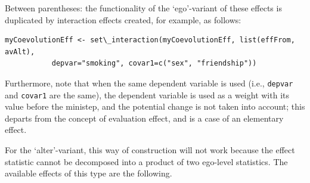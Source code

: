 \documentclass[a4paper,fleqn,11pt]{article}
\newcommand{\+}{\, + \,}
\begin{document}
Between parentheses: the functionality of the `ego'-variant of these effects is duplicated by
interaction effects created, for example, as follows:
\begin{verbatim}
myCoevolutionEff <- set\_interaction(myCoevolutionEff, list(effFrom, avAlt),
           depvar="smoking", covar1=c("sex", "friendship"))
\end{verbatim}
Furthermore, note that when the same dependent variable is used
(i.e., \texttt{depvar} and \texttt{covar1} are the same),
the dependent variable is used as a weight with its value
before the ministep, and the potential change is not taken into account;
this departs from the concept of evaluation effect,
and is a case of an elementary effect.

For the `alter'-variant, this way of construction will not work because the
effect statistic cannot be decomposed into a product of two ego-level statistics.
The available effects of this type are the following.
\end{document}
